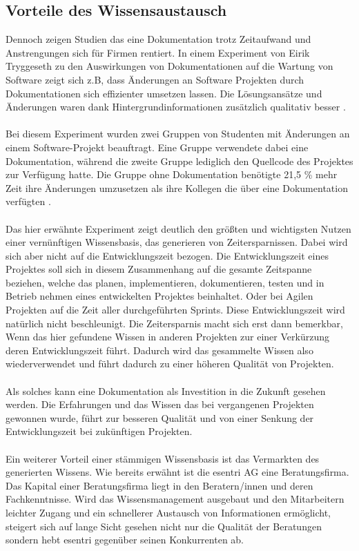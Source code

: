 \documentclass[a4paper,12pt,twoside]{scrartcl}
\begin{document}
\subsection{Vorteile des Wissensaustausch}
\label{Zeitersparnis}
Dennoch zeigen Studien das eine Dokumentation trotz Zeitaufwand und Anstrengungen sich für Firmen rentiert. In einem Experiment von Eirik Tryggeseth zu den Auswirkungen von Dokumentationen auf die Wartung von Software zeigt sich z.B, dass Änderungen an Software Projekten durch Dokumentationen sich effizienter umsetzen lassen. Die Lösungsansätze und Änderungen waren dank Hintergrundinformationen zusätzlich qualitativ besser \cite{Tryggeseth1997}.
\\\\
Bei diesem Experiment wurden zwei Gruppen von Studenten mit Änderungen an einem Software-Projekt beauftragt. Eine Gruppe verwendete dabei eine Dokumentation, während die zweite Gruppe lediglich den Quellcode des Projektes zur Verfügung hatte. Die Gruppe ohne Dokumentation benötigte 21,5 \% mehr Zeit ihre Änderungen umzusetzen als ihre Kollegen die über eine Dokumentation verfügten \cite{Tryggeseth1997}.
\\\\
Das hier erwähnte Experiment zeigt deutlich den größten und wichtigsten Nutzen einer vernünftigen Wissensbasis, das generieren von Zeitersparnissen. Dabei wird sich aber nicht auf die Entwicklungszeit bezogen. Die Entwicklungszeit eines Projektes soll sich in diesem Zusammenhang auf die gesamte Zeitspanne beziehen, welche das planen, implementieren, dokumentieren, testen und in Betrieb nehmen eines entwickelten Projektes beinhaltet. Oder bei Agilen Projekten auf die Zeit aller durchgeführten Sprints. Diese Entwicklungszeit wird natürlich nicht beschleunigt. Die Zeitersparnis macht sich erst dann bemerkbar, Wenn das hier gefundene Wissen in anderen Projekten zur einer Verkürzung deren Entwicklungszeit führt. Dadurch wird das gesammelte Wissen also wiederverwendet und führt dadurch zu einer höheren Qualität von Projekten.
\\\\
Als solches kann eine Dokumentation als Investition in die Zukunft gesehen werden. Die Erfahrungen und das Wissen das bei vergangenen Projekten gewonnen wurde, führt zur besseren Qualität und von einer Senkung der Entwicklungszeit bei zukünftigen Projekten.
\\\\
Ein weiterer Vorteil einer stämmigen Wissensbasis ist das Vermarkten des generierten Wissens. Wie bereits erwähnt ist die esentri AG eine Beratungsfirma. Das Kapital einer Beratungsfirma liegt in den Beratern/innen und deren Fachkenntnisse. Wird das Wissensmanagement ausgebaut und den Mitarbeitern leichter Zugang und ein schnellerer Austausch von Informationen ermöglicht, steigert sich auf lange Sicht gesehen nicht nur die Qualität der Beratungen sondern hebt esentri gegenüber seinen Konkurrenten ab.
\end{document}
